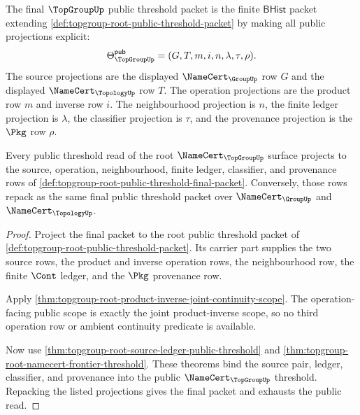 \begin{definition}
\label{def:topgroup-root-public-threshold-final-packet}
The final $\TopGroupUp$ public threshold packet is the finite
$\mathsf{BHist}$ packet extending
\autoref{def:topgroup-root-public-threshold-packet} by making all public
projections explicit:
$$
\Theta^{\mathsf{pub}}_{\TopGroupUp}=(G,T,m,i,n,\lambda,\tau,\rho).
$$
The source projections are the displayed $\NameCert_{\GroupUp}$ row $G$ and
the displayed $\NameCert_{\TopologyUp}$ row $T$. The operation projections are
the product row $m$ and inverse row $i$. The neighbourhood projection is $n$,
the finite ledger projection is $\lambda$, the classifier projection is $\tau$,
and the provenance projection is the $\Pkg$ row $\rho$.
\end{definition}

\begin{theorem}
\label{thm:topgroup-root-public-threshold-exhaustion}
Every public threshold read of the root $\NameCert_{\TopGroupUp}$ surface
projects to the source, operation, neighbourhood, finite ledger, classifier,
and provenance rows of
\autoref{def:topgroup-root-public-threshold-final-packet}. Conversely, those
rows repack as the same final public threshold packet over
$\NameCert_{\GroupUp}$ and $\NameCert_{\TopologyUp}$.
\end{theorem}
\begin{proof}
Project the final packet to the root public threshold packet of
\autoref{def:topgroup-root-public-threshold-packet}. Its carrier part supplies
the two source rows, the product and inverse operation rows, the neighbourhood
row, the finite $\Cont$ ledger, and the $\Pkg$ provenance row.

Apply \autoref{thm:topgroup-root-product-inverse-joint-continuity-scope}. The
operation-facing public scope is exactly the joint product-inverse scope, so no
third operation row or ambient continuity predicate is available.

Now use \autoref{thm:topgroup-root-source-ledger-public-threshold} and
\autoref{thm:topgroup-root-namecert-frontier-threshold}. These theorems bind
the source pair, ledger, classifier, and provenance into the public
$\NameCert_{\TopGroupUp}$ threshold. Repacking the listed projections gives the
final packet and exhausts the public read.
\end{proof}

